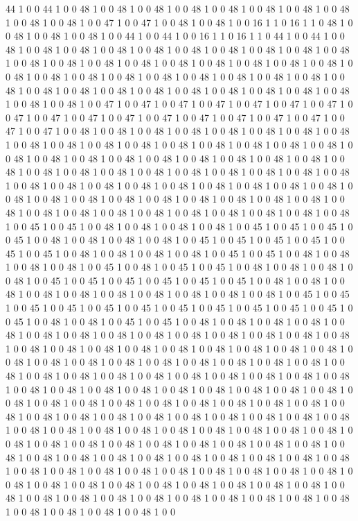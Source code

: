 44
1
0
0
44
1
0
0
48
1
0
0
48
1
0
0
48
1
0
0
48
1
0
0
48
1
0
0
48
1
0
0
48
1
0
0
48
1
0
0
48
1
0
0
48
1
0
0
47
1
0
0
47
1
0
0
48
1
0
0
48
1
0
0
16
1
1
0
16
1
1
0
48
1
0
0
48
1
0
0
48
1
0
0
48
1
0
0
44
1
0
0
44
1
0
0
16
1
1
0
16
1
1
0
44
1
0
0
44
1
0
0
48
1
0
0
48
1
0
0
48
1
0
0
48
1
0
0
48
1
0
0
48
1
0
0
48
1
0
0
48
1
0
0
48
1
0
0
48
1
0
0
48
1
0
0
48
1
0
0
48
1
0
0
48
1
0
0
48
1
0
0
48
1
0
0
48
1
0
0
48
1
0
0
48
1
0
0
48
1
0
0
48
1
0
0
48
1
0
0
48
1
0
0
48
1
0
0
48
1
0
0
48
1
0
0
48
1
0
0
48
1
0
0
48
1
0
0
48
1
0
0
48
1
0
0
48
1
0
0
48
1
0
0
48
1
0
0
48
1
0
0
48
1
0
0
48
1
0
0
48
1
0
0
48
1
0
0
48
1
0
0
47
1
0
0
47
1
0
0
47
1
0
0
47
1
0
0
47
1
0
0
47
1
0
0
47
1
0
0
47
1
0
0
47
1
0
0
47
1
0
0
47
1
0
0
47
1
0
0
47
1
0
0
47
1
0
0
47
1
0
0
47
1
0
0
47
1
0
0
47
1
0
0
48
1
0
0
48
1
0
0
48
1
0
0
48
1
0
0
48
1
0
0
48
1
0
0
48
1
0
0
48
1
0
0
48
1
0
0
48
1
0
0
48
1
0
0
48
1
0
0
48
1
0
0
48
1
0
0
48
1
0
0
48
1
0
0
48
1
0
0
48
1
0
0
48
1
0
0
48
1
0
0
48
1
0
0
48
1
0
0
48
1
0
0
48
1
0
0
48
1
0
0
48
1
0
0
48
1
0
0
48
1
0
0
48
1
0
0
48
1
0
0
48
1
0
0
48
1
0
0
48
1
0
0
48
1
0
0
48
1
0
0
48
1
0
0
48
1
0
0
48
1
0
0
48
1
0
0
48
1
0
0
48
1
0
0
48
1
0
0
48
1
0
0
48
1
0
0
48
1
0
0
48
1
0
0
48
1
0
0
48
1
0
0
48
1
0
0
48
1
0
0
48
1
0
0
48
1
0
0
48
1
0
0
48
1
0
0
48
1
0
0
48
1
0
0
48
1
0
0
48
1
0
0
48
1
0
0
48
1
0
0
48
1
0
0
48
1
0
0
48
1
0
0
48
1
0
0
45
1
0
0
45
1
0
0
48
1
0
0
48
1
0
0
48
1
0
0
48
1
0
0
45
1
0
0
45
1
0
0
45
1
0
0
45
1
0
0
48
1
0
0
48
1
0
0
48
1
0
0
48
1
0
0
45
1
0
0
45
1
0
0
45
1
0
0
45
1
0
0
45
1
0
0
45
1
0
0
48
1
0
0
48
1
0
0
48
1
0
0
48
1
0
0
45
1
0
0
45
1
0
0
48
1
0
0
48
1
0
0
48
1
0
0
48
1
0
0
45
1
0
0
48
1
0
0
45
1
0
0
45
1
0
0
48
1
0
0
48
1
0
0
48
1
0
0
48
1
0
0
45
1
0
0
45
1
0
0
45
1
0
0
45
1
0
0
45
1
0
0
45
1
0
0
48
1
0
0
48
1
0
0
48
1
0
0
48
1
0
0
48
1
0
0
48
1
0
0
48
1
0
0
48
1
0
0
48
1
0
0
48
1
0
0
45
1
0
0
45
1
0
0
45
1
0
0
45
1
0
0
45
1
0
0
45
1
0
0
45
1
0
0
45
1
0
0
45
1
0
0
45
1
0
0
45
1
0
0
45
1
0
0
48
1
0
0
48
1
0
0
45
1
0
0
45
1
0
0
48
1
0
0
48
1
0
0
48
1
0
0
48
1
0
0
48
1
0
0
48
1
0
0
48
1
0
0
48
1
0
0
48
1
0
0
48
1
0
0
48
1
0
0
48
1
0
0
48
1
0
0
48
1
0
0
48
1
0
0
48
1
0
0
48
1
0
0
48
1
0
0
48
1
0
0
48
1
0
0
48
1
0
0
48
1
0
0
48
1
0
0
48
1
0
0
48
1
0
0
48
1
0
0
48
1
0
0
48
1
0
0
48
1
0
0
48
1
0
0
48
1
0
0
48
1
0
0
48
1
0
0
48
1
0
0
48
1
0
0
48
1
0
0
48
1
0
0
48
1
0
0
48
1
0
0
48
1
0
0
48
1
0
0
48
1
0
0
48
1
0
0
48
1
0
0
48
1
0
0
48
1
0
0
48
1
0
0
48
1
0
0
48
1
0
0
48
1
0
0
48
1
0
0
48
1
0
0
48
1
0
0
48
1
0
0
48
1
0
0
48
1
0
0
48
1
0
0
48
1
0
0
48
1
0
0
48
1
0
0
48
1
0
0
48
1
0
0
48
1
0
0
48
1
0
0
48
1
0
0
48
1
0
0
48
1
0
0
48
1
0
0
48
1
0
0
48
1
0
0
48
1
0
0
48
1
0
0
48
1
0
0
48
1
0
0
48
1
0
0
48
1
0
0
48
1
0
0
48
1
0
0
48
1
0
0
48
1
0
0
48
1
0
0
48
1
0
0
48
1
0
0
48
1
0
0
48
1
0
0
48
1
0
0
48
1
0
0
48
1
0
0
48
1
0
0
48
1
0
0
48
1
0
0
48
1
0
0
48
1
0
0
48
1
0
0
48
1
0
0
48
1
0
0
48
1
0
0
48
1
0
0
48
1
0
0
48
1
0
0
48
1
0
0
48
1
0
0
48
1
0
0
48
1
0
0
48
1
0
0
48
1
0
0
48
1
0
0
48
1
0
0
48
1
0
0
48
1
0
0
48
1
0
0
48
1
0
0
48
1
0
0
48
1
0
0
48
1
0
0
48
1
0
0
48
1
0
0
48
1
0
0
48
1
0
0
48
1
0
0
48
1
0
0
48
1
0
0
48
1
0
0
48
1
0
0
48
1
0
0
48
1
0
0
48
1
0
0
48
1
0
0
48
1
0
0
48
1
0
0
